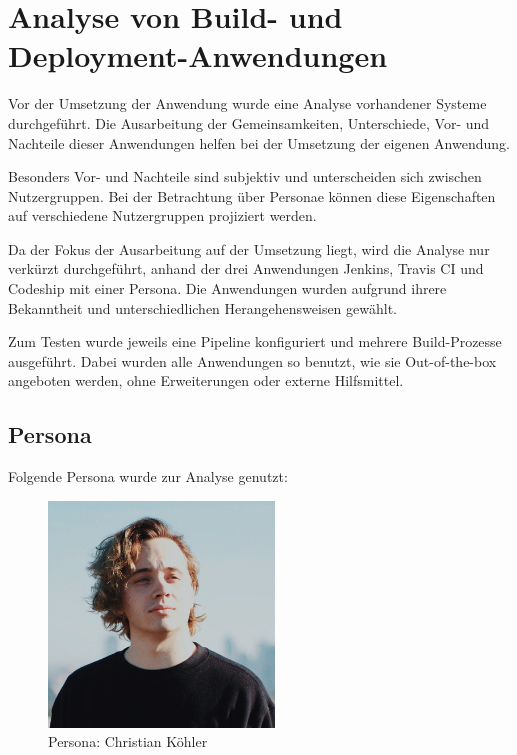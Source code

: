 \chapter{Analyse von Build- und Deployment-Anwendungen}

Vor der Umsetzung der Anwendung wurde eine Analyse vorhandener Systeme durchgeführt. Die Ausarbeitung der Gemeinsamkeiten, Unterschiede, Vor- und Nachteile dieser Anwendungen helfen bei der Umsetzung der eigenen Anwendung.

Besonders Vor- und Nachteile sind subjektiv und unterscheiden sich zwischen Nutzergruppen. Bei der Betrachtung über Personae können diese Eigenschaften auf verschiedene Nutzergruppen projiziert werden.

Da der Fokus der Ausarbeitung auf der Umsetzung liegt, wird die Analyse nur verkürzt durchgeführt, anhand der drei Anwendungen Jenkins, Travis CI und Codeship mit einer Persona. Die Anwendungen wurden aufgrund ihrere Bekanntheit und unterschiedlichen Herangehensweisen gewählt.

Zum Testen wurde jeweils eine Pipeline konfiguriert und mehrere Build-Prozesse ausgeführt. Dabei wurden alle Anwendungen so benutzt, wie sie Out-of-the-box angeboten werden, ohne Erweiterungen oder externe Hilfsmittel.

\section{Persona}

Folgende Persona wurde zur Analyse genutzt:

\begin{figure}[h]
  \caption{Persona: Christian Köhler}
  \label{fig:persona}
  \includegraphics[width=6cm]{assets/persona}
\end{figure}

